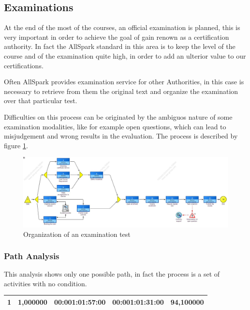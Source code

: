 \subsection{Examinations}
At the end of the most of the courses, an official examination is planned,
this is very important in order to achieve the goal of gain renown as a
certification authority. In fact the AllSpark standard in this area is to
keep the level of the course and of the examination quite high, in order to
add an ulterior value to our certifications.

Often AllSpark provides examination service for other Authorities, in this
case is necessary to retrieve from them the original text and organize the
examination over that particular test.

Difficulties on this process can be originated by the ambiguos nature of
some examination modalities, like for example open questions, which can
lead to misjudgement and wrong results in the evaluation.
The process is described by figure \ref{2img:examination}.

\begin{figure}[!ht]
\centering
\includegraphics[scale=0.35, angle=90]{assign2/adonis/imgs/examination.jpg}
\caption{Organization of an examination test}
\label{2img:examination}
\end{figure}



\subsubsection{Path Analysis}
This analysis shows only one possible path, in fact the process is a set
of activities with no condition.

\begin{table}[ht!]
\centering
\begin{tabular}{|l|l|l|l|l|}
\hline
1&1,000000&00:001:01:57:00&00:001:01:31:00&94,100000\\
\hline
\end{tabular}
\end{table}

